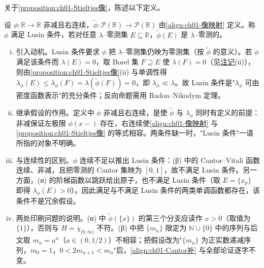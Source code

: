\documentclass[../../main.tex]{subfiles}%
\begin{document}
关于\cref{proposition:ch01-Stieltjes像}，陈述以下定义。

\begin{definition}\label{definition:ch01-Lusin条件}
设 $\phi:\mathbb{R}\to\mathbb{R}$ 非减且右连续，$\widetilde{\phi}:\mathcal{P}(\mathbb{R})\to\mathcal{P}(\mathbb{R})$ 由\eqref{align:ch01-像映射} 定义。称 $\phi$ 满足 Lusin 条件，若对任意 $\lambda$--零测集 $E\subseteq\mathbb{R}$，$\widetilde{\phi}(E)$ 是 $\lambda$--零测的。
\end{definition}

\begin{remark}\label{remark:ch01-Lusin条件}
\begin{enumerate}[(i)]
\item 引入动机。Lusin 条件要求 $\phi$ 把 $\lambda$--零测集仍映为零测集（按 $\widetilde{\phi}$ 的意义）。若 $\phi$ 满足该条件而 $\lambda(E)=0$，取 Borel 集 $F\supseteq E$ 使 $\lambda(F)=0$（见\hyperref[remark:ch01-Lebesgue性质]{注记}(ii)），则由\cref{proposition:ch01-Stieltjes像}(ii) 与单调性得 $\lambda_\phi(E)\leqslant\lambda_\phi(F)=\lambda(\widetilde{\phi}(F))=0$，即 $\lambda_\phi\ll\lambda$。故 Lusin 条件是"$\lambda_\phi$ 可由密度函数表示"的充分条件；反向命题需用 Radon--Nikodym 定理。
\item 继承假设的作用。定义中 $\phi$ 非减且右连续，是使 $\widetilde{\phi}$ 与 $\lambda_\phi$ 同时有定义的前提：非减保证左极限 $\phi(x-)$ 存在，右连续使\eqref{align:ch01-像映射} 与\cref{proposition:ch01-Stieltjes像} 的等式相容。两条件缺一时，"Lusin 条件"一语所指的对象不明确。
\item 与连续性的区别。$\phi$ 连续不足以推出 Lusin 条件：(β) 中的 Cantor--Vitali 函数连续、非减，且把零测的 Cantor 集映为 $[0,1]$，故不满足 Lusin 条件。另一方面，(α) 的阶梯函数以跳跃给出原子，也不满足 Lusin 条件（取 $E=\{x_p\}$ 即得 $\lambda_\phi(E)>0$）。因此满足与不满足 Lusin 条件的两类单调函数都存在，该条件不是冗余假设。
\item 两处印刷问题的说明。(α) 中 $\widetilde{\phi}(\{x\})$ 的第三个分支应读作 $x>0$（取值为 $\{1\}$），否则与 $H=\chi_{[0,\infty)}$ 不符。(β) 中把 $\{m_n\}$ 限定为 $\mathbb{N}\cup\{0\}$ 中的序列与后文取 $m_n=a^n$（$a\in(0,1/2)$）不相容；把假设改为"$\{m_n\}$ 为正实数递减序列，$m_0=1$，$0<2m_{n+1}<m_n$"后，\eqref{align:ch01-Cantor补} 与全部论证逐字不变。
\end{enumerate}
\end{remark}
\end{document}
